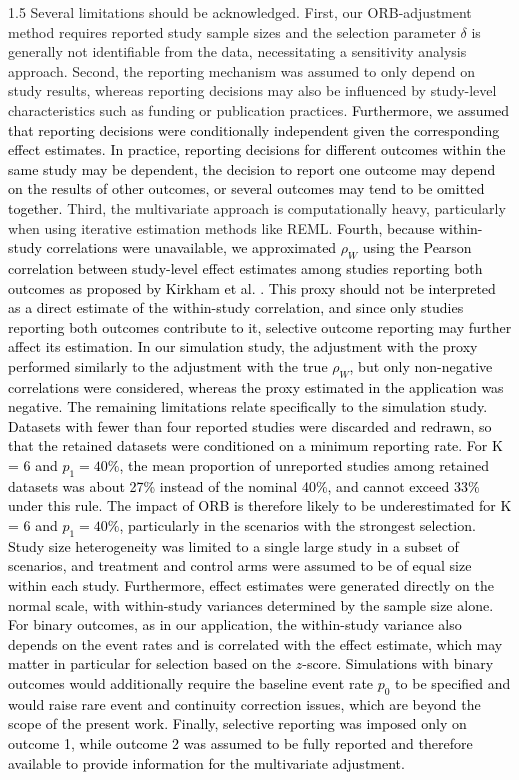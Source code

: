 \documentclass{article}
\newcommand{\mycolor}[1]{\textcolor{black}{#1}}
\begin{document}
\begin{spacing}{1.5}
Several limitations should be acknowledged. First, our ORB-adjustment method requires reported study sample sizes and the selection parameter $\delta$ is generally not identifiable from the data, necessitating a sensitivity analysis approach. Second, the reporting mechanism was assumed to only depend on study results, whereas reporting decisions may also be influenced by study-level characteristics such as funding or publication practices. \mycolor{Furthermore, we assumed that reporting decisions were conditionally independent given the corresponding effect estimates. In practice, reporting decisions for different outcomes within the same study may be dependent, \eg the decision to report one outcome may depend on the results of other outcomes, or several outcomes may tend to be omitted together.} Third, the multivariate approach is computationally heavy, particularly when using iterative estimation methods like REML. \mycolor{Fourth, because within-study correlations were unavailable, we approximated $\rho_W$ using the Pearson correlation between study-level effect estimates among studies reporting both outcomes as proposed by Kirkham et al. \cite{kirkham2012multivariate}. This proxy should not be interpreted as a direct estimate of the within-study correlation, and since only studies reporting both outcomes contribute to it, selective outcome reporting may further affect its estimation. In our simulation study, the adjustment with the proxy performed similarly to the adjustment with the true $\rho_W$, but only non-negative correlations were considered, whereas the proxy estimated in the application was negative.}
\mycolor{The remaining limitations relate specifically to the simulation study. Datasets with fewer than four reported studies were discarded and redrawn, so that the retained datasets were conditioned on a minimum reporting rate. For K = 6 and $p_1 = 40\%$, the mean proportion of unreported studies among retained datasets was about 27\% instead of the nominal 40\%, and cannot exceed 33\% under this rule. The impact of ORB is therefore likely to be underestimated for K = 6 and $p_1 = 40\%$, particularly in the scenarios with the strongest selection. Study size heterogeneity was limited to a single large study in a subset of scenarios, and treatment and control arms were assumed to be of equal size within each study. Furthermore, effect estimates were generated directly on the normal scale, with within-study variances determined by the sample size alone. For binary outcomes, as in our application, the within-study variance also depends on the event rates and is correlated with the effect estimate, which may matter in particular for selection based on the $z$-score. Simulations with binary outcomes would additionally require the baseline event rate $p_0$ to be specified \cite{inthout2014hartung} and would raise rare event and continuity correction issues, which are beyond the scope of the present work. Finally, selective reporting was imposed only on outcome 1, while outcome 2 was assumed to be fully reported and therefore available to provide information for the multivariate adjustment.}


\end{spacing}
\end{document}
